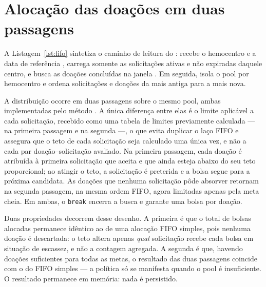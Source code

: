 

\section{Alocação das doações em duas passagens}

A Listagem~\ref{lst:fifo} sintetiza o caminho de leitura do :  recebe o hemocentro e a data de referência , carrega somente as solicitações ativas e não expiradas daquele centro, e  busca as doações concluídas na janela . Em seguida,  isola o pool por hemocentro e ordena solicitações e doações da mais antiga para a mais nova.

A distribuição ocorre em duas passagens sobre o mesmo pool, ambas implementadas pelo método . A única diferença entre elas é o limite aplicável a cada solicitação, recebido como uma tabela de limites previamente calculada ---  na primeira passagem e  na segunda ---, o que evita duplicar o laço FIFO e assegura que o teto de cada solicitação seja calculado uma única vez, e não a cada par doação--solicitação avaliado. Na primeira passagem, cada doação é atribuída à primeira solicitação que  aceita e que ainda esteja abaixo do seu teto proporcional; ao atingir o teto, a solicitação é preterida e a bolsa segue para a próxima candidata. As doações que nenhuma solicitação pôde absorver retornam na segunda passagem, na mesma ordem FIFO, agora limitadas apenas pela meta cheia. Em ambas, o \texttt{break} encerra a busca e garante uma bolsa por doação.

Duas propriedades decorrem desse desenho. A primeira é que o total de bolsas alocadas permanece idêntico ao de uma alocação FIFO simples, pois nenhuma doação é descartada: o teto altera apenas \textit{qual} solicitação recebe cada bolsa em situação de escassez, e não a contagem agregada. A segunda é que, havendo doações suficientes para todas as metas, o resultado das duas passagens coincide com o do FIFO simples --- a política só se manifesta quando o pool é insuficiente. O resultado permanece em memória: nada é persistido.

